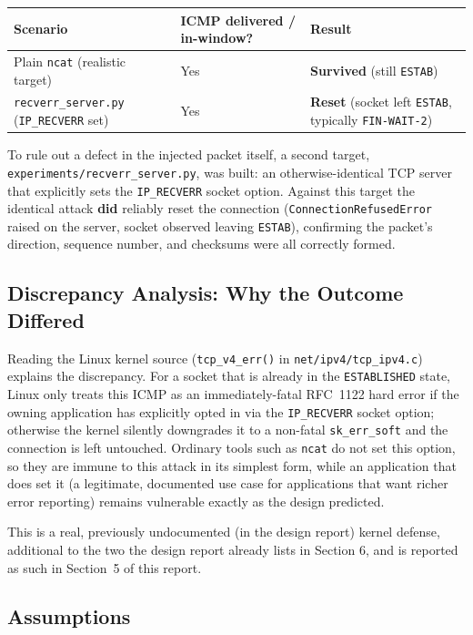 \documentclass[11pt]{article}
\begin{document}
\begin{center}
\begin{tabular}{@{}lll@{}}
\toprule
\textbf{Scenario} & \textbf{ICMP delivered / in-window?} & \textbf{Result} \\
\midrule
Plain \texttt{ncat} (realistic target) & Yes & \textbf{Survived} (still \texttt{ESTAB}) \\
\texttt{recverr\_server.py} (\texttt{IP\_RECVERR} set) & Yes & \textbf{Reset} (socket left \texttt{ESTAB}, typically \texttt{FIN-WAIT-2}) \\
\bottomrule
\end{tabular}
\end{center}

To rule out a defect in the injected packet itself, a second target,
\texttt{experiments/recverr\_server.py}, was built: an otherwise-identical
TCP server that explicitly sets the \texttt{IP\_RECVERR} socket option.
Against this target the identical attack \textbf{did} reliably reset the
connection (\texttt{ConnectionRefusedError} raised on the server, socket
observed leaving \texttt{ESTAB}), confirming the packet's direction,
sequence number, and checksums were all correctly formed.

\subsection{Discrepancy Analysis: Why the Outcome Differed}

Reading the Linux kernel source (\texttt{tcp\_v4\_err()} in
\texttt{net/ipv4/tcp\_ipv4.c}) explains the discrepancy. For a socket
that is already in the \texttt{ESTABLISHED} state, Linux only treats
this ICMP as an immediately-fatal RFC~1122 hard error if the owning
application has explicitly opted in via the \texttt{IP\_RECVERR} socket
option; otherwise the kernel silently downgrades it to a non-fatal
\texttt{sk\_err\_soft} and the connection is left untouched. Ordinary
tools such as \texttt{ncat} do not set this option, so they are immune
to this attack in its simplest form, while an application that does set
it (a legitimate, documented use case for applications that want richer
error reporting) remains vulnerable exactly as the design predicted.

This is a real, previously undocumented (in the design report) kernel
defense, additional to the two the design report already lists in
Section 6, and is reported as such in Section~5 of this report.

\subsection{Assumptions}
\end{document}

